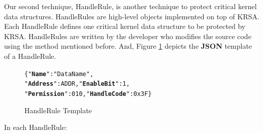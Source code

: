 \documentclass[conference]{IEEEtran}
\begin{document}
%

Our second technique, HandleRule, is another technique to protect critical kernel data structures. HandleRules are high-level objects implemented on top of KRSA. Each HandleRule defines one critical kernel data structure to be protected by KRSA. HandleRules are written by the developer who modifies the source code using the method mentioned before. And, Figure \ref{hdrltemp} depicts the \textbf{JSON} template of a HandleRule. 

\begin{figure}[ht]
    \centering
    \begin{alltt}
{    \{"\textbf{Name}": "Data Name", 
    "\textbf{Address}": ADDR, "\textbf{EnableBit}": 1, 
    "\textbf{Permission}":010, "\textbf{HandleCode}":0x3F\}} \end{alltt}
\setlength{\abovecaptionskip}{0pt}
\setlength{\belowcaptionskip}{0pt}
\caption{HandleRule Template}
\label{hdrltemp}
\end{figure}

In each HandleRule: 
\end{document}

